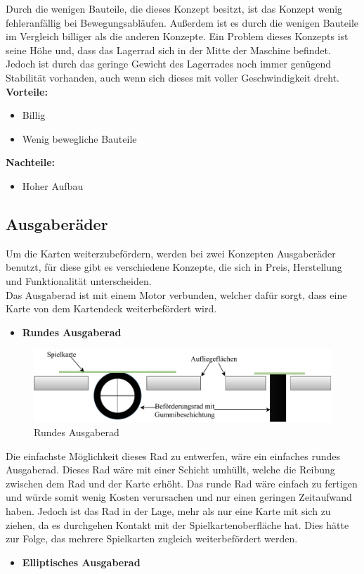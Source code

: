Durch die wenigen Bauteile, die dieses Konzept besitzt, ist das Konzept wenig fehleranfällig bei Bewegungsabläufen.
Außerdem ist es durch die wenigen Bauteile im Vergleich billiger als die anderen Konzepte.
Ein Problem dieses Konzepts ist seine Höhe und, dass das Lagerrad sich in der Mitte der Maschine befindet.
Jedoch ist durch das geringe Gewicht des Lagerrades noch immer genügend Stabilität vorhanden, auch wenn sich dieses mit voller Geschwindigkeit dreht. \\

\textbf{Vorteile:}
\begin{itemize}
    \item Billig
    \item Wenig bewegliche Bauteile
\end{itemize}
\textbf{Nachteile:}
\begin{itemize}
    \item Hoher Aufbau
\end{itemize}

\subsection{Ausgaberäder}
Um die Karten weiterzubefördern, werden bei zwei Konzepten Ausgaberäder benutzt, für diese gibt es verschiedene Konzepte, die sich in Preis, Herstellung und Funktionalität unterscheiden.\\
Das Ausgaberad ist mit einem Motor verbunden, welcher dafür sorgt, dass eine Karte von dem Kartendeck weiterbefördert wird.
\begin{itemize}
    \item \textbf{Rundes Ausgaberad}
\end{itemize}

\begin{figure}[H]
    \centering
    \includegraphics[scale=0.9,page=1]{fig/mech/RundesAusgaberad-Page-1}
    \caption{Rundes Ausgaberad}
\end{figure}

Die einfachste Möglichkeit dieses Rad zu entwerfen, wäre ein einfaches rundes Ausgaberad.
Dieses Rad wäre mit einer Schicht umhüllt, welche die Reibung zwischen dem Rad und der Karte erhöht.
Das runde Rad wäre einfach zu fertigen und würde somit wenig Kosten verursachen und nur einen geringen Zeitaufwand haben.
Jedoch ist das Rad in der Lage, mehr als nur eine Karte mit sich zu ziehen, da es durchgehen Kontakt mit der Spielkartenoberfläche hat.
Dies hätte zur Folge, das mehrere Spielkarten zugleich weiterbefördert werden.
\begin{itemize}
    \item \textbf{Elliptisches Ausgaberad}
\end{itemize}


